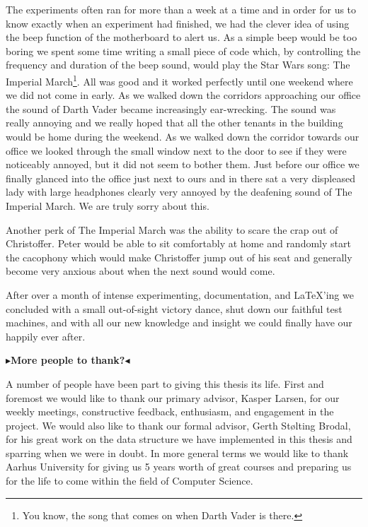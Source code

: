 \documentclass[twoside,11pt,openright]{report}
\newcommand{\todo}[1]{{\color[rgb]{.5,0,0}\textbf{$\blacktriangleright$#1$\blacktriangleleft$}}}
\begin{document}
The experiments often ran for more than a week at a time and in order for us to know exactly when an experiment had finished, we had the clever idea of using the beep function of the motherboard to alert us. As a simple beep would be too boring we spent some time writing a small piece of code which, by controlling the frequency and duration of the beep sound, would play the Star Wars song: The Imperial March\footnote{You know, the song that comes on when Darth Vader is there.}. All was good and it worked perfectly until one weekend where we did not come in early. As we walked down the corridors approaching our office the sound of Darth Vader became increasingly ear-wrecking. The sound was really annoying and we really hoped that all the other tenants in the building would be home during the weekend. As we walked down the corridor towards our office we looked through the small window next to the door to see if they were noticeably annoyed, but it did not seem to bother them. Just before our office we finally glanced into the office just next to ours and in there sat a very displeased lady with large headphones clearly very annoyed by the deafening sound of The Imperial March. We are truly sorry about this.

Another perk of The Imperial March was the ability to scare the crap out of Christoffer. Peter would be able to sit comfortably at home and randomly start the cacophony which would make Christoffer jump out of his seat and generally become very anxious about when the next sound would come.

After over a month of intense experimenting, documentation, and \LaTeX'ing we concluded with a small out-of-sight victory dance, shut down our faithful test machines, and with all our new knowledge and insight we could finally have our happily ever after.

\todo{More people to thank?}

A number of people have been part to giving this thesis its life. First and foremost we would like to thank our primary advisor, Kasper Larsen, for our weekly meetings, constructive feedback, enthusiasm, and engagement in the project.
We would also like to thank our formal advisor, Gerth St\o lting Brodal, for his great work on the data structure we have implemented in this thesis and sparring when we were in doubt.
In more general terms we would like to thank Aarhus University for giving us 5 years worth of great courses and preparing us for the life to come within the field of Computer Science.
\end{document}
